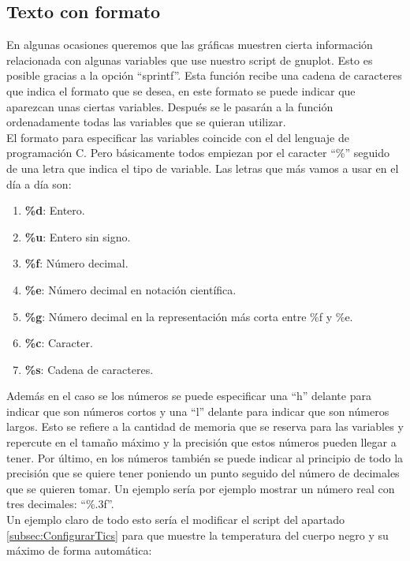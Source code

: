 \documentclass[11pt,a4paper,twoside,pdf]{article}
\numberwithin{equation}{section}
\begin{document}
\subsection{Texto con formato\label{subsec:TextoFormateado}}

En algunas ocasiones queremos que las gráficas muestren cierta información relacionada con algunas variables que use nuestro script de gnuplot. Esto es posible gracias a la opción ``sprintf''. Esta función recibe una cadena de caracteres que indica el formato que se desea, en este formato se puede indicar que aparezcan unas ciertas variables. Después se le pasarán a la función ordenadamente todas las variables que se quieran utilizar.\\

El formato para especificar las variables coincide con el del lenguaje de programación C. Pero básicamente todos empiezan por el caracter ``\%'' seguido de una letra que indica el tipo de variable. Las letras que más vamos a usar en el día a día son:

\begin{enumerate}
	\item \textbf{\%d}: Entero.
	\item \textbf{\%u}: Entero sin signo.
	\item \textbf{\%f}: Número decimal.
	\item \textbf{\%e}: Número decimal en notación científica.
	\item \textbf{\%g}: Número decimal en la representación más corta entre \%f y \%e.
	\item \textbf{\%c}: Caracter.
	\item \textbf{\%s}: Cadena de caracteres.
\end{enumerate}

Además en el caso se los números se puede especificar una ``h'' delante para indicar que son números cortos y una ``l'' delante para indicar que son números largos. Esto se refiere a la cantidad de memoria que se reserva para las variables y repercute en el tamaño máximo y la precisión que estos números pueden llegar a tener. Por último, en los números también se puede indicar al principio de todo la precisión que se quiere tener poniendo un punto seguido del número de decimales que se quieren tomar. Un ejemplo sería por ejemplo mostrar un número real con tres decimales: ``\%.3f''. \\

Un ejemplo claro de todo esto sería el modificar el script del apartado \ref{subsec:ConfigurarTics} para que muestre la temperatura del cuerpo negro y su máximo de forma automática:
\end{document}
